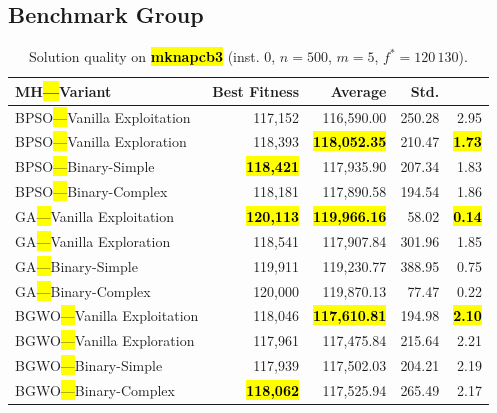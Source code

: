 \documentclass[mathematics,article,accept,moreauthors]{Definitions/mdpi}
\begin{document}
\subsection{Benchmark Group }

\vspace{-9pt}

\begin{table}[H]
  \small
  \caption{Solution quality on \textbf{\hl{mknapcb3}} (inst. 0, $n=500$, $m=5$, $f^*=120\,130$).}
  \label{tab:calidad_mknapcb3_0}
  \begin{tabularx}{\textwidth}{lRRRR}
    \toprule
    \textbf{MH\hl{---}Variant} &
    \textbf{Best Fitness} &
    \textbf{Average} &
    \textbf{Std.} &
    \textbf{} \\
    \midrule
    BPSO\hl{---}Vanilla Exploitation &         117,152 &        116,590.00 & 250.28 &         2.95 \\
    BPSO\hl{---}Vanilla Exploration  &         118,393 & \textbf{\hl{118,052.35}} & 210.47 & \textbf{\hl{1.73}} \\
    BPSO\hl{---}Binary-Simple        & \textbf{\hl{118,421}} &        117,935.90 & 207.34 &         1.83 \\
    BPSO\hl{---}Binary-Complex       &         118,181 &        117,890.58 & 194.54 &         1.86 \\
    \midrule
    GA\hl{---}Vanilla Exploitation   & \textbf{\hl{120,113}} & \textbf{\hl{119,966.16}} &  58.02 & \textbf{\hl{0.14}} \\
    GA\hl{---}Vanilla Exploration    &         118,541 &        117,907.84 & 301.96 &         1.85 \\
    GA\hl{---}Binary-Simple          &         119,911 &        119,230.77 & 388.95 &         0.75 \\
    GA\hl{---}Binary-Complex         &         120,000 &        119,870.13 &  77.47 &         0.22 \\
    \midrule
    BGWO\hl{---}Vanilla Exploitation &         118,046 & \textbf{\hl{117,610.81}} & 194.98 & \textbf{\hl{2.10}} \\
    BGWO\hl{---}Vanilla Exploration  &         117,961 &        117,475.84 & 215.64 &         2.21 \\
    BGWO\hl{---}Binary-Simple        &         117,939 &        117,502.03 & 204.21 &         2.19 \\
    BGWO\hl{---}Binary-Complex       & \textbf{\hl{118,062}} &        117,525.94 & 265.49 &         2.17 \\

\end{tabularx}
\end{table}
\end{document}
